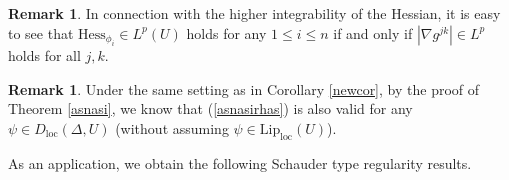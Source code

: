 \documentclass[11pt,reqno]{amsart}
\theoremstyle{definition}
\newtheorem{remark}[theorem]{Remark}
\numberwithin{equation}{section}
\DeclareMathOperator{\loc}{loc}
\begin{document}
\begin{remark}\label{remintegra}
    In connection with the higher integrability of the Hessian, it is easy to see that $\mathrm{Hess}_{\phi_i} \in L^p(U)$ holds for any $1\leq i \leq n$ if and only if $|\nabla g^{jk}| \in L^p$ holds for all $j, k$.
\end{remark}
\begin{remark}\label{asnasi2222}
    Under the same setting as in Corollary \ref{newcor}, by the proof of Theorem \ref{asnasi}, we know that (\ref{asnasirhas}) is also valid for any $\psi\in D_{\loc}(\Delta, U)$ (without assuming $\psi \in \mathrm{Lip}_{\loc}(U)$).
\end{remark}




As an application, we obtain the following Schauder type regularity results.
\end{document}

